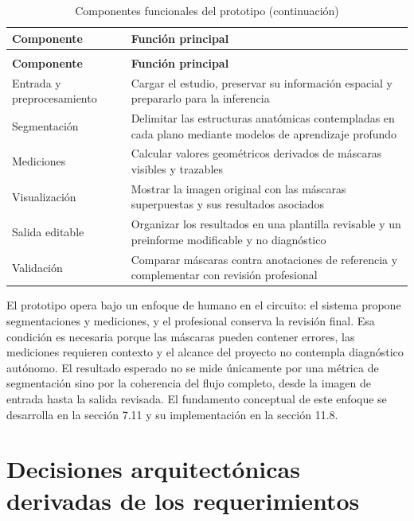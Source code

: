 {\small
\setlength{\LTleft}{0pt}
\setlength{\LTright}{0pt}
\setlength{\tabcolsep}{2pt}
\renewcommand{\arraystretch}{1.18}
\begin{longtable}{>{\raggedright\arraybackslash}p{} >{\raggedright\arraybackslash}p{}}
\caption{Componentes funcionales del prototipo}\label{tab:arch-componentes-funcionales}\\
\hline
\textbf{Componente} & \textbf{Función principal} \\
\hline
\endfirsthead
\caption[]{Componentes funcionales del prototipo (continuación)}\\
\hline
\textbf{Componente} & \textbf{Función principal} \\
\hline
\endhead
\hline
\endfoot
Entrada y preprocesamiento & Cargar el estudio, preservar su información espacial y prepararlo para la inferencia \\
Segmentación & Delimitar las estructuras anatómicas contempladas en cada plano mediante modelos de aprendizaje profundo \\
Mediciones & Calcular valores geométricos derivados de máscaras visibles y trazables \\
Visualización & Mostrar la imagen original con las máscaras superpuestas y sus resultados asociados \\
Salida editable & Organizar los resultados en una plantilla revisable y un preinforme modificable y no diagnóstico \\
Validación & Comparar máscaras contra anotaciones de referencia y complementar con revisión profesional \\
\hline
\end{longtable}
}

El prototipo opera bajo un enfoque de humano en el circuito: el sistema propone segmentaciones y mediciones, y el profesional conserva la revisión final. Esa condición es necesaria porque las máscaras pueden contener errores, las mediciones requieren contexto y el alcance del proyecto no contempla diagnóstico autónomo. El resultado esperado no se mide únicamente por una métrica de segmentación sino por la coherencia del flujo completo, desde la imagen de entrada hasta la salida revisada. El fundamento conceptual de este enfoque se desarrolla en la sección 7.11 y su implementación en la sección 11.8.

\section{Decisiones arquitectónicas derivadas de los requerimientos}

